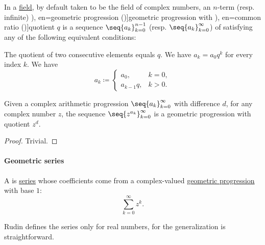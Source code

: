 \begin{definition}\label{def:geometric_progression}
  In a \hyperref[def:field]{field}, by default taken to be the field of complex numbers, an \( n \)-term (resp. infinite) \term[ru=геометрическая прогрессия (\cite[144]{АлександровМаркушевичХинчин1952ЭнциклопедияТом3}), en=geometric progression (\cite[def. 2.4.2]{Rosen2019DiscreteMathematics})]{geometric progression} with \term[ru=знаменатель (прогрессии) (\cite[\S 227]{Киселёв2004Геометрия}), en=common ratio (\cite[def. 2.4.2]{Rosen2019DiscreteMathematics})]{quotient} \( q \) is a sequence \( \seq{ a_k }_{k=0}^{n-1} \) (resp. \( \seq{ a_k }_{k=0}^\infty \)) of  satisfying any of the following equivalent conditions:
  \begin{thmenum}
     The quotient of two consecutive elements equals \( q \).
     We have \( a_k = a_0 q^k \) for every index \( k \).
     We have
    \begin{equation}\label{eq:def:geometric_progression/recursive}
      a_k \coloneqq \begin{cases}
        a_0,       &k = 0, \\
        a_{k-1} q, &k > 0.
      \end{cases}
    \end{equation}
  \end{thmenum}
\end{definition}

\begin{proposition}\label{thm:arithmetic_to_geometric_progression}
  Given a complex arithmetic progression \( \seq{ a_k }_{k=0}^\infty \) with difference \( d \), for any complex number \( z \), the sequence \( \seq{ z^{a_k} }_{k=0}^\infty \) is a geometric progression with quotient \( z^d \).
\end{proposition}
\begin{proof}
  Trivial.
\end{proof}

\paragraph{Geometric series}

\begin{definition}\label{def:geometric_series}
  A  is \hyperref[def:convergent_series]{series} whose coefficients come from a complex-valued \hyperref[def:geometric_progression]{geometric progression} with base \( 1 \):
  \begin{equation}\label{eq:def:geometric_series}
    \sum_{k=0}^\infty z^k.
  \end{equation}
\end{definition}
\begin{comments}
  \item Rudin defines the series only for real numbers, for the generalization is straightforward.
\end{comments}

